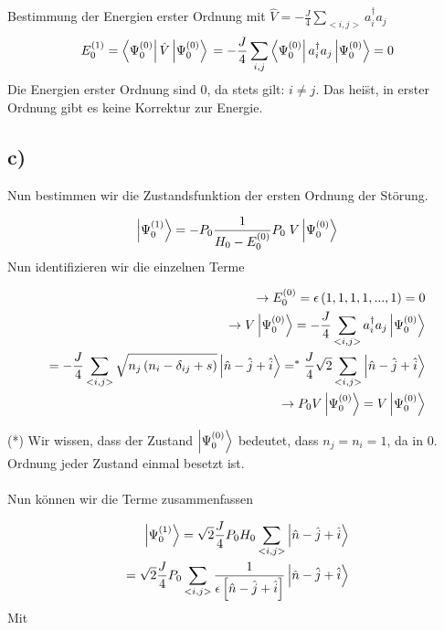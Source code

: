 Bestimmung der Energien erster Ordnung mit $\hat{V} = - \frac{J}{4} \sum_{<i,j>} a_i^{\dagger} a_j$
\begin{equation}
 E_0^{\left( 1 \right)} = \Bra{\Psi_0^{\left( 0 \right)}} \hat{V} \Ket{\Psi_0^{\left( 0 \right)}} \\
 = - \frac{J}{4} \sum_{i,j} \Bra{\Psi_0^{\left( 0 \right)}} a_i^{\dagger} a_j \Ket{\Psi_0^{\left( 0 \right)}} = 0
\end{equation}
Die Energien erster Ordnung sind 0, da stets gilt: $i \neq j$. Das hei\"st, in erster Ordnung gibt es keine Korrektur zur Energie.

\subsection{c)}

Nun bestimmen wir die Zustandsfunktion der ersten Ordnung der St\"orung.

\begin{align}
\Ket{\Psi_0^{\left( 1 \right)}} = - P_0 \frac{1}{H_0 - E_0^{\left( 0 \right)}} P_0 \; V\Ket{\Psi_0^{\left( 0 \right)}} \\
\end{align}
Nun identifizieren wir die einzelnen Terme

\begin{align}
\rightarrow E_0^{\left( 0 \right)} = \epsilon \left(1,1,1,1,...,1 \right) = 0 \\
\rightarrow V\Ket{\Psi_0^{\left( 0 \right)}} = - \frac{J}{4} \sum_{<i,j>} a_i^{\dagger} a_j \Ket{\Psi_0^{\left( 0 \right)}} \\
= - \frac{J}{4} \sum_{<i,j>} \sqrt{n_j \left( n_i - \delta_{ij} + s \right)} \Ket{\hat{n} - \hat{j} + \hat{i}}
=^* \frac{J}{4} \sqrt{2} \sum_{<i,j>} \Ket{\hat{n} - \hat{j} + \hat{i}} \\
\rightarrow P_0 V \Ket{\Psi_0^{\left( 0 \right)}} = V\Ket{\Psi_0^{\left( 0 \right)}}
\end{align}

(*) Wir wissen, dass der Zustand $\Ket{\Psi_0^{\left( 0 \right)}}$ bedeutet, dass $n_j = n_i = 1$, da in 0. Ordnung jeder Zustand einmal besetzt ist.\\
 \\
Nun k\"onnen wir die Terme zusammenfassen

\begin{align}
\Ket{\Psi_0^{\left( 1 \right)}} = \sqrt{2} \frac{J}{4} P_0 H_0 \sum_{<i,j>} \Ket{\hat{n} - \hat{j} + \hat{i}} \\
= \sqrt{2} \frac{J}{4} P_0 \sum_{<i,j>} \frac{1}{\epsilon \left[\hat{n} - \hat{j} + \hat{i} \right]} \Ket{\hat{n} - \hat{j} + \hat{i}}
\end{align}
Mit

